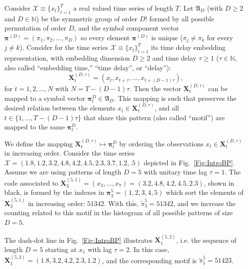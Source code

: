 \documentclass[journal]{IEEEtran}
\renewcommand{\Bbb}{\mathbb}
\begin{document}
	Consider ${\mathcal X} \equiv \{x_t\}_{t=1}^{T}$ a real valued time series of length $T$. 
	Let ${\mathfrak A}_{D}$ (with $D \geq 2$ and $D \in {\Bbb N}$) be the symmetric group of order $D!$ formed by all 
	possible permutation of order $D$, and the symbol component vector 
	${\bm \pi}^{(D)} = (\pi_1, \pi_2, \dots, \pi_D)$ so every element ${\bm \pi}^{(D)}$ is unique 
	($\pi_j \neq \pi_k$ for every $j \neq k$). 
	Consider for the time series ${\mathcal X} \equiv \{x_t\}_{t=1}^{T}$ its time delay embedding representation,
	with embedding dimension $D \geq 2$ and time delay $\tau \geq 1$ ($\tau \in {\Bbb N}$, also called ``embedding time,'' ``time delay'', or ``delay''):
	\begin{equation} 
	\label{eq:time-delay}
	{\mathbf X}^{(D,\tau)}_t =( x_t,x_{t+\tau},\dots,x_{t+(D-1)\tau} ) ,
	\end{equation} 
	for $t = 1,2,\dots,N$ with $N = T-(D-1) \tau$.
	Then the vector ${\mathbf X}^{(D,\tau)}_t$ can be mapped to a symbol vector ${\bm \pi}_t^D \in {\mathfrak A}_{D}$. 
	This mapping is such that preserves the desired relation between the elements 
	$x_t  \in {\mathbf X}^{(D,\tau)}_t$, and all $t \in \{1,\dots,T-(D-1)\tau\}$ that share this pattern (also called ``motif'') are mapped to the same 
	${\bm \pi}_t^{D}$.
	
	We define the mapping ${\mathbf X}_t^{(D,\tau)} \mapsto {\mathbf \pi}_t^{D}$ by ordering the observations $x_t \in {\mathbf X}_t^{(D,\tau)}$ in increasing order.
	Consider the time series $\mathcal X = (1.8, 1.2, 3.2, 4.8, 4.2, 4.5, 2.3, 3.7, 1.2, .5)$ depicted in Fig.~\ref{Fig:IntroBP}.
	Assume we are using patterns of length $D=5$ with unitary time lag $\tau=1$.
	The code associated to $\mathbf X_{3}^{(5,1)}=(x_3,\dots,x_7)=(3.2, 4.8, 4.2, 4.5, 2.3)$, shown in black, is formed by the indexes in $\bm\pi_3^{5}=(1,2,3,4,5)$ which sort the elements of $\mathbf X_{3}^{(5,1)}$ in increasing order: $51342$.
	With this, $\widetilde{\pi}_3^{5} = 51342$, and we increase the counting related to this motif in the histogram of all possible patterns of size $D=5$.
	
	The dash-dot line in Fig.~\ref{Fig:IntroBP} illustrates $\mathbf X_{1}^{(5,2)}$, i.e. the sequence of length $D=5$ starting at $x_1$ with lag $\tau=2$.
	In this case, $\mathbf X_{1}^{(5,2)}= (1.8, 3.2, 4.2, 2.3, 1.2)$, and the corresponding motif is $\widetilde{\pi}_1^{5}=51423$.
	
\end{document}
